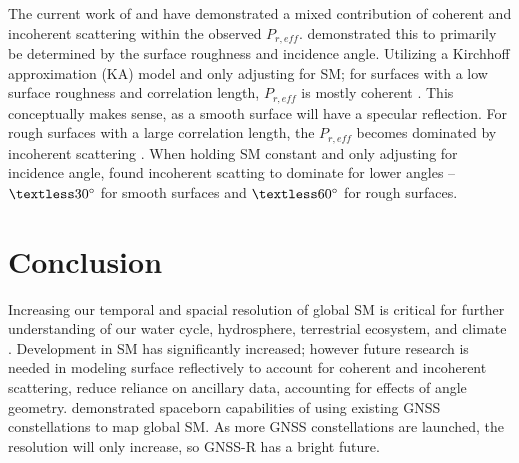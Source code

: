 \documentclass[12pt]{article}
\begin{document}
The current work of \textcite{Elevation_Angle_Impact} and \textcite{Semiempirical_Modeling} have demonstrated a mixed contribution of coherent and incoherent scattering within the observed $P_{r, eff}$. \citeauthor{Semiempirical_Modeling} demonstrated this to primarily be determined by the surface roughness and incidence angle. Utilizing a Kirchhoff approximation (KA) model and only adjusting for SM; for surfaces with a low surface roughness and correlation length, $P_{r, eff}$ is mostly coherent \cite{Semiempirical_Modeling}. This conceptually makes sense, as a smooth surface will have a specular reflection. For rough surfaces with a large correlation length, the $P_{r, eff}$ becomes dominated by incoherent scattering \cite{Semiempirical_Modeling}. When holding SM constant and only adjusting for incidence angle, \citeauthor{Semiempirical_Modeling} found incoherent scatting to dominate for lower angles -- $\textless 30\degree$ for smooth surfaces and $\textless 60\degree$ for rough surfaces. 

\section{Conclusion}
Increasing our temporal and spacial resolution of global SM is critical for further understanding of our water cycle, hydrosphere, terrestrial ecosystem, and climate \cite{CYGNSS, GNSS_R_Spaceborn_Challenges}. Development in SM has significantly increased; however future research is needed in modeling surface reflectively to account for coherent and incoherent scattering, reduce reliance on ancillary data, accounting for effects of angle geometry. \citeauthor{CYGNSS} demonstrated spaceborn capabilities of using existing GNSS constellations to map global SM. As more GNSS constellations are launched, the resolution will only increase, so GNSS-R has a bright future.  

\clearpage
\printbibliography
\end{document}
